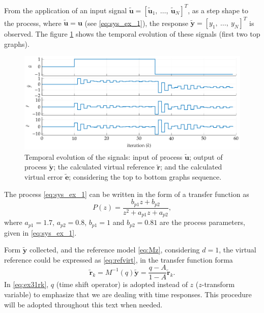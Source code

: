 \begin{exmp}
   
   From the application of an input signal $\tilde{\bm{u}}=[\tilde{\bm{u}}_1,\ \dots,\ \tilde{\bm{u}}_N]^T$, as a step shape to the process, where $\tilde{\bm{u}} = \bm{u}$ (see \eqref{eq:sys_ex_1}), the response $\tilde{\bm{y}} = [y_1,\ \dots,\ y_N]^T$  is observed. The figure  \ref{fig:u_y_til_VRFT} shows the temporal evolution of these signals (first two top graphs).
   \begin{figure}[htpb]
      \footnotesize
      \centering
      \includegraphics{Figs/exp31_sinais_treinamento.pdf}
      \caption{Temporal evolution of the signals: input of process $\tilde{\bm{u}}$; output of process $\tilde{\bm{y}}$; the calculated virtual reference $\tilde{\bm{r}}$; and the calculated virtual error $\tilde{\bm{e}}$; considering the top to bottom graphs sequence.}
      \label{fig:u_y_til_VRFT}
   \end{figure}
   The process \eqref{eq:sys_ex_1} can be written in the form of a transfer function as
   \begin{equation}
      P(z) = \frac{b_{p 1}z + b_{p 2} }{z^2 + a_{p 1}z + a_{p 2}},
      \label{eq:ex31.Pz}
   \end{equation}
   where $a_{p 1}=1.7$, $a_{p 2}=0.8$, $b_{p 1} = 1$ and $b_{p 2}=0.81$ are the process parameters, given in \eqref{eq:sys_ex_1}.

   Form $\tilde{\bm{y}}$ collected, and the reference model \eqref{eq:Mz}, considering $d=1$,  the virtual  reference could be expressed as \eqref{eq:refvirt}, in the transfer function forma
   \begin{equation}
      \tilde{\bm{r}}_k = M^{-1}(q) \tilde{\bm{y}} = \frac{q-A}{1-A} \tilde{\bm{r}}_k.
   \label{eq:ex31rk}
   \end{equation}
   In \eqref{eq:ex31rk}, $q$ (time shift operator) is adopted instead of $z$ ($z$-transform variable) to emphasize that we are dealing with time responses. This procedure will be adopted throughout this text when needed.


\end{exmp}
